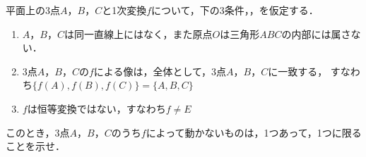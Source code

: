 \documentclass[../../main.tex]{subfiles}
\begin{document}
平面上の3点$A$，$B$，$C$と1次変換$f$について，下の3条件，，を仮定する．
\begin{enumerate}
  \item [\ding{"AC}]$A$，$B$，$C$は同一直線上にはなく，また原点$O$は三角形$ABC$の内部には属さない．
  \item [\ding{"AD}]3点$A$，$B$，$C$の$f$による像は，全体として，3点$A$，$B$，$C$に一致する，
    すなわち$ \{ f(A),f(B),f(C) \} = \{ A,B,C \} $
  \item [\ding{"AE}]$f$は恒等変換ではない，すなわち$f \neq E$
\end{enumerate}
このとき，3点$A$，$B$，$C$のうち$f$によって動かないものは，1つあって，1つに限ることを示せ．
\end{document}
